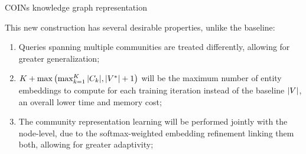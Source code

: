\begin{algorithm}[ht!]%
\caption{COINs knowledge graph representation}
\label{algorithm:coins}
\begin{algorithmic}[1]
\ELSE
{}
\ENDIF
{}
\end{algorithmic}
\end{algorithm} 
This new construction has several desirable properties, unlike the baseline: 
\begin{enumerate}
    \item Queries spanning multiple communities are treated differently, allowing for greater generalization; 
    \item $K + \max{\mathopen{}\left(\max_{k=1}^{K}{\mathopen{}\left|C_k\right|},\mathopen{}\left|V^{*}\right| + 1\right)}$ will be the maximum number of entity embeddings to compute for each training iteration instead of the baseline $\mathopen{}\left|V\right|$, an overall lower time and memory cost;
    \item The community representation learning will be performed jointly with the node-level, due to the softmax-weighted embedding refinement linking them both, allowing for greater adaptivity;
\end{enumerate}

